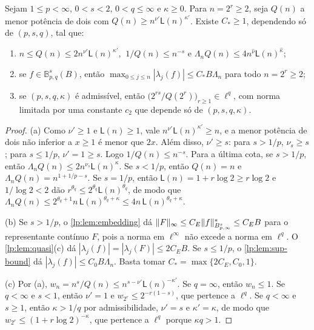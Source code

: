 \documentclass[12pt,a4paper]{article}
\begin{document}
\begin{lema}
\label{lp:lem:uniform-height}
Sejam $1\le p<\infty$, $0<s<2$, $0<q\le\infty$ e $\kappa\ge0$. Para $n=2^r\ge2$, seja $Q(n)$ a menor potência de dois com $Q(n)\ge n^{\nu'}\mathsf L(n)^{\kappa'}$. Existe $C_*\ge1$, dependendo só de $(p,s,q)$, tal que:
\begin{enumerate}[label=(\alph*)]
 \item $n\le Q(n)\le2n^{\nu'}\mathsf L(n)^{\kappa'}$, $\ 1/Q(n)\le n^{-s}$ e $\Lambda_nQ(n)\le4n^{\hat\nu}\mathsf L(n)^{\hat\kappa}$;
 \item se $f\in\mathbb B^s_{p,q}(B)$, então $\max_{0\le j\le n}|\lambda_j(f)|\le C_*B\Lambda_n$ para todo $n=2^r\ge2$;
 \item se $(p,s,q,\kappa)$ é admissível, então $\big(2^{rs}/Q(2^r)\big)_{r\ge1}\in\ell^q$, com norma limitada por uma constante $c_2$ que depende só de $(p,s,q,\kappa)$.
\end{enumerate}
\end{lema}

\begin{proof}
(a) Como $\nu'\ge1$ e $\mathsf L(n)\ge1$, vale $n^{\nu'}\mathsf L(n)^{\kappa'}\ge n$, e a menor potência de dois não inferior a $x\ge1$ é menor que $2x$. Além disso, $\nu'\ge s$: para $s>1/p$, $\nu_s\ge s$; para $s\le1/p$, $\nu'=1\ge s$. Logo $1/Q(n)\le n^{-s}$. Para a última cota, se $s>1/p$, então $\Lambda_nQ(n)\le2n^{\nu_s}\mathsf L(n)^\kappa$. Se $s<1/p$, então $Q(n)=n$ e $\Lambda_nQ(n)=n^{1+1/p-s}$. Se $s=1/p$, então $\mathsf L(n)=1+r\log2\ge r\log2$ e $1/\log2<2$ dão $r^{\theta_q}\le2^{\theta_q}\mathsf L(n)^{\theta_q}$, de modo que $\Lambda_nQ(n)\le2^{\theta_q+1}n\,\mathsf L(n)^{\theta_q+\kappa}\le4n\,\mathsf L(n)^{\theta_q+\kappa}$.

(b) Se $s>1/p$, o \cref{lp:lem:embedding} dá $\|F\|_\infty\le C_E\|f\|^*_{B^{s}_{p,\infty}}\le C_EB$ para o representante contínuo $F$, pois a norma em $\ell^\infty$ não excede a norma em $\ell^q$. O \cref{lp:lem:quasi}(c) dá $|\lambda_j(f)|=|\lambda_j(F)|\le2C_EB$. Se $s\le1/p$, o \cref{lp:lem:sup-bound} dá $|\lambda_j(f)|\le C_0B\Lambda_n$. Basta tomar $C_*=\max\{2C_E,C_0,1\}$.

(c) Por (a), $w_n=n^s/Q(n)\le n^{s-\nu'}\mathsf L(n)^{-\kappa'}$. Se $q=\infty$, então $w_n\le1$. Se $q<\infty$ e $s<1$, então $\nu'=1$ e $w_{2^r}\le2^{-r(1-s)}$, que pertence a $\ell^q$. Se $q<\infty$ e $s\ge1$, então $\kappa>1/q$ por admissibilidade, $\nu'=s$ e $\kappa'=\kappa$, de modo que $w_{2^r}\le(1+r\log2)^{-\kappa}$, que pertence a $\ell^q$ porque $\kappa q>1$.
\end{proof}
\end{document}
